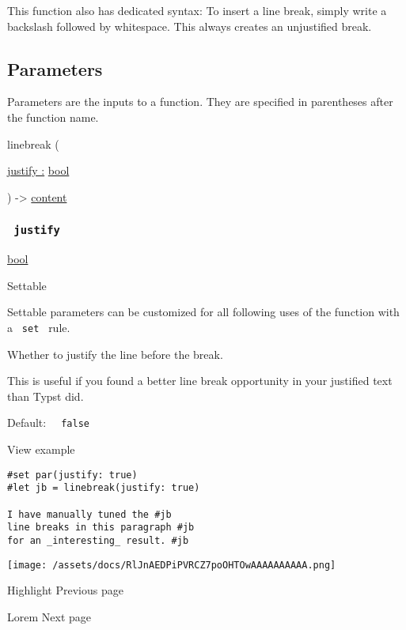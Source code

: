 This function also has dedicated syntax: To insert a line break, simply
write a backslash followed by whitespace. This always creates an
unjustified break.

\subsection{\texorpdfstring{{ Parameters
}}{ Parameters }}\label{parameters}

\label{parameters-tooltip}
Parameters are the inputs to a function. They are specified in
parentheses after the function name.

{ linebreak } (

{ \hyperref[parameters-justify]{justify :}
\href{/docs/reference/foundations/bool/}{bool} }

) -\textgreater{} \href{/docs/reference/foundations/content/}{content}

\subsubsection{\texorpdfstring{\texttt{\ justify\ }}{ justify }}\label{parameters-justify}

\href{/docs/reference/foundations/bool/}{bool}

{{ Settable }}

\label{parameters-justify-settable-tooltip}
Settable parameters can be customized for all following uses of the
function with a \texttt{\ set\ } rule.

Whether to justify the line before the break.

This is useful if you found a better line break opportunity in your
justified text than Typst did.

Default: \texttt{\ }{\texttt{\ false\ }}\texttt{\ }


View example

\begin{verbatim}
#set par(justify: true)
#let jb = linebreak(justify: true)

I have manually tuned the #jb
line breaks in this paragraph #jb
for an _interesting_ result. #jb
\end{verbatim}

\texttt{[image: /assets/docs/RlJnAEDPiPVRCZ7poOHTOwAAAAAAAAAA.png]}

\href{/docs/reference/text/highlight/}{\pandocbounded{}}

{ Highlight } { Previous page }

\href{/docs/reference/text/lorem/}{\pandocbounded{}}

{ Lorem } { Next page }
